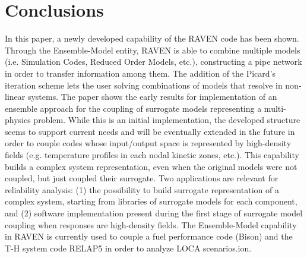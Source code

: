\section{Conclusions}
\label{sec:conclusions}
In this paper, a newly developed capability of the RAVEN code has been shown. Through the Ensemble-Model entity, RAVEN is able to combine multiple models (i.e. Simulation Codes, Reduced Order Models, etc.), constructing a pipe network in order to transfer information among them. The addition of the Picard’s iteration scheme lets the user solving combinations of models that resolve in non-linear systems. 
The paper shows the early results for implementation of an ensemble approach for the coupling of surrogate models representing a multi-physics problem. While this is an initial implementation, the developed structure seems to support current needs and will be eventually extended in the future in order to couple codes whose input/output space is represented by high-density fields (e.g. temperature profiles in each nodal kinetic zones, etc.). This capability builds a complex system representation, even when the original models were not coupled, but just coupled their surrogate. Two applications are relevant for reliability analysis: (1) the possibility to build surrogate representation of a complex system, starting from libraries of surrogate models for each component, and (2) software implementation present during the first stage of surrogate model coupling when responses are high-density fields. 
The Ensemble-Model capability in RAVEN is currently used to couple a fuel performance code (Bison) and the T-H system code RELAP5 in order to analyze LOCA scenarios.ion.
